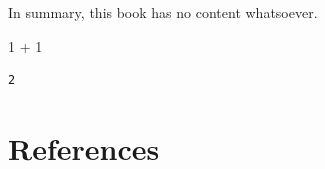 \documentclass[
  letterpaper,
  DIV=11,
  numbers=noendperiod]{scrreprt}
\newenvironment{Shaded}{\begin{snugshade}}{\end{snugshade}}
\newcommand{\DecValTok}[1]{\textcolor[rgb]{0.68,0.00,0.00}{#1}}
\newcommand{\OperatorTok}[1]{\textcolor[rgb]{0.37,0.37,0.37}{#1}}
\begin{document}
In summary, this book has no content whatsoever.

\begin{Shaded}
\begin{Highlighting}[]
\DecValTok{1} \OperatorTok{+} \DecValTok{1}
\end{Highlighting}
\end{Shaded}

\begin{verbatim}
2
\end{verbatim}


\hypertarget{references}{%
\chapter*{References}\label{references}}
\end{document}
